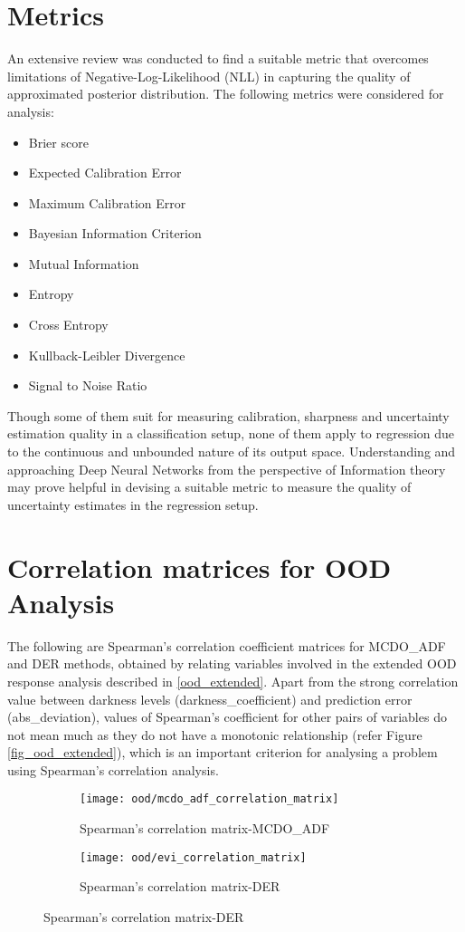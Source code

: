 

    \chapter{Metrics}
    An extensive review was conducted to find a suitable metric that overcomes limitations of Negative-Log-Likelihood (NLL) in capturing the quality of approximated posterior distribution. The following metrics were considered for analysis:
    \begin{itemize}
	\item Brier score
	\item Expected Calibration Error
	\item Maximum Calibration Error
	\item Bayesian Information Criterion
	\item Mutual Information
	\item Entropy
	\item Cross Entropy
	\item Kullback-Leibler Divergence
	\item Signal to Noise Ratio
    \end{itemize}
	Though some of them suit for measuring calibration, sharpness and uncertainty estimation quality in a classification setup, none of them apply to regression due to the continuous and unbounded nature of its output space. Understanding and approaching Deep Neural Networks from the perspective of Information theory \cite{saxe2019on} may prove helpful in devising a suitable metric to measure the quality of uncertainty estimates in the regression setup.
	\chapter{Correlation matrices for OOD Analysis}
	The following are Spearman's correlation coefficient matrices for MCDO\_ADF and DER methods, obtained by relating variables involved in the extended OOD response analysis described in \ref{ood_extended}. Apart from the strong correlation value between darkness levels (darkness\_coefficient) and prediction error (abs\_deviation), values of Spearman's coefficient for other pairs of variables do not mean much as they do not have a monotonic relationship (refer Figure \ref{fig_ood_extended}), which is an important criterion for analysing a problem using Spearman's correlation analysis.
	\begin{figure}[H]
	\begin{subfigure}[b]{0.5\textwidth}
	\texttt{[image: ood/mcdo\_adf\_correlation\_matrix]}
	\caption{Spearman's correlation matrix-MCDO\_ADF}
	\label{homo_fn1}
	\end{subfigure}
	\hfill
	\begin{subfigure}[b]{0.5\textwidth}
	\texttt{[image: ood/evi\_correlation\_matrix]}
	\caption{Spearman's correlation matrix-DER}
	\label{hetero_fn1}
	\end{subfigure}
	\hfill
	\end{figure}

